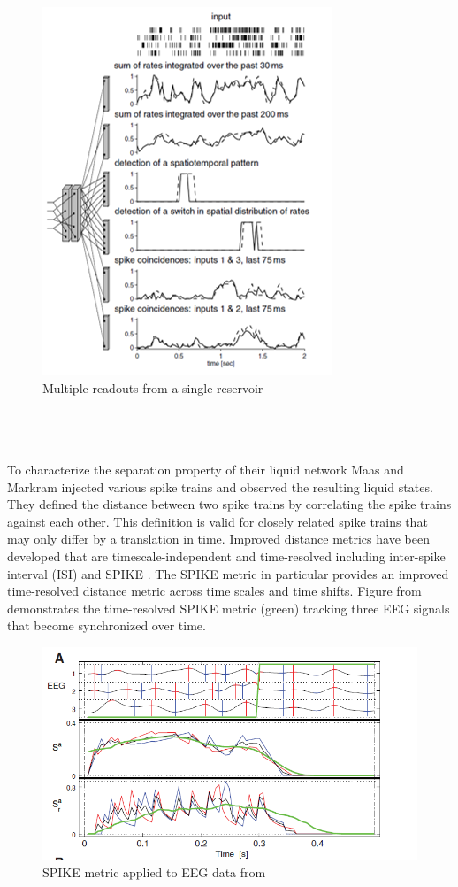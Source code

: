 \documentclass[a4paper,11pt]{article}
\begin{document}
\begin{figure}
	\centering
	\includegraphics{fig/MultipleReadouts}
	\caption{Multiple readouts from a single reservoir \cite{maas2002}}
	\label{fig:lsm_multiple_readouts}
\end{figure}\\
\\ \\
To characterize the separation property of their liquid network Maas and Markram injected various spike trains and observed the resulting liquid states.
They defined the distance between two spike trains by correlating the spike trains against each other.
This definition is valid for closely related spike trains that may only differ by a translation in time.  
Improved distance metrics have been developed that are timescale-independent and time-resolved including inter-spike interval (ISI) and SPIKE \cite{kreuz2012}.
The SPIKE metric in particular provides an improved time-resolved distance metric across time scales and time shifts.
Figure from \cite{kreuz2012} demonstrates the time-resolved SPIKE metric (green) tracking three EEG signals that become synchronized over time.
\begin{figure}
	\caption{SPIKE metric applied to EEG data from \cite{kreuz2012}}
	\centering
	\includegraphics[width=\textwidth]{fig/SPIKE}
\end{figure}\\
\end{document}
